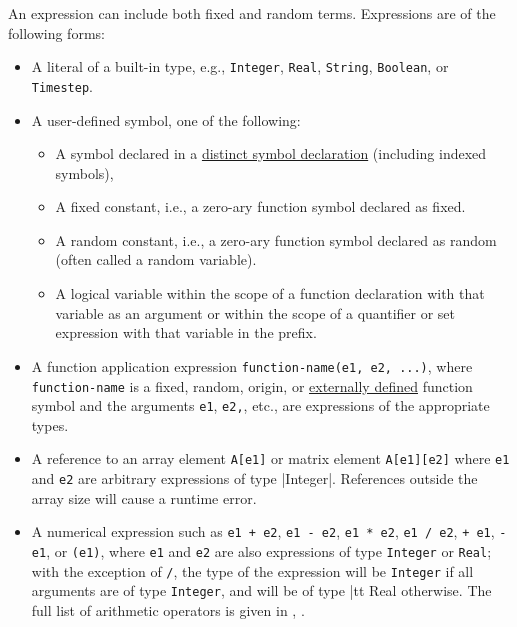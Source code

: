 \documentclass[12pt]{article}
\begin{document}
An expression can include both fixed and random terms.  Expressions are of the following forms:
\begin{itemize}
\item A literal of a built-in type, e.g., {\tt Integer}, {\tt Real},
  {\tt String}, {\tt Boolean}, or {\tt Timestep}.
\item A user-defined symbol, one of the following:
\begin{itemize}
\item A symbol declared in a \hyperref[distinct-section]{distinct
  symbol declaration} (including indexed symbols),
\item A fixed constant, i.e., a zero-ary function symbol declared as fixed.
\item A random constant, i.e., a zero-ary function symbol declared as
  random (often called a random variable).
\item A logical variable within the scope of a function declaration
  with that variable as an argument or within the scope of a
  quantifier or set expression with that variable in the prefix.
\end{itemize}
\item A function application expression {\tt function-name(e1, e2,
  ...)}, where {\tt function-name} is a fixed, random, origin, or
  \hyperref[external-function-section]{externally defined} function
  symbol and the arguments {\tt e1}, {\tt e2,}, etc., are
  expressions of the appropriate types.
\item A reference to an array element {\tt A[e1]} or matrix element
  {\tt A[e1][e2]} where {\tt e1} and {\tt e2} are arbitrary
  expressions of type \blog|Integer|.%
  References outside the array size will cause a runtime error.
\item A numerical expression such as \texttt{e1 + e2}, \texttt{e1 - e2},
  \texttt{e1 * e2}, \texttt{e1 / e2},  \texttt{+ e1},
  \texttt{- e1}, or \texttt{(e1)}, 
  where \texttt{e1} and \texttt{e2} are also expressions of
  type \texttt{Integer} or \texttt{Real};
  with the exception of {\tt /}, the type of the expression will be
  {\tt Integer} if all arguments are of type {\tt Integer}, and will
  be of type {|tt Real} otherwise. The full list of arithmetic
  operators is given in , .

\end{itemize}
\end{document}
